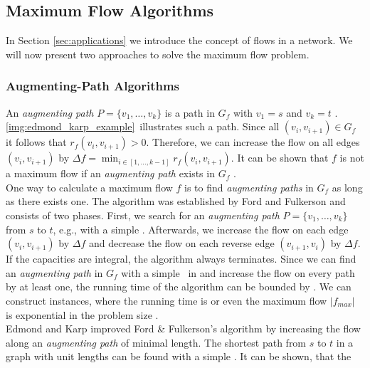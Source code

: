 
\subsection{Maximum Flow Algorithms}
\label{sec:max_flow}

In Section \ref{sec:applications} we introduce the concept of flows in a network. We
will now present two approaches to solve the maximum flow problem.

\subsubsection{Augmenting-Path Algorithms}
\label{sec:aug_path}

An \emph{augmenting path} $P = \{v_1,\ldots,v_k\}$ is a path in $G_f$ with $v_1 = s$ and 
$v_k = t$ \cite{edmonds1972theoretical}. \autoref{img:edmond_karp_example}~illustrates such a path.
Since all $(v_i,v_{i+1}) \in G_f$ it follows that $r_f(v_i,v_{i+1}) > 0$. 
Therefore, we can increase the flow on all edges $(v_i,v_{i+1})$ by 
$\Delta f = \min_{i \in [1,\ldots,k-1]} r_f(v_i,v_{i+1})$. It can be shown that $f$ is not a
maximum flow if an \emph{augmenting path} exists in $G_f$ \cite{edmonds1972theoretical}. \\
One way to calculate a maximum flow $f$ is to find \emph{augmenting paths} in $G_f$ as
long as there exists one. The algorithm was established by Ford and Fulkerson \cite{ford1956maximal} and
consists of two phases. First, we search for an \emph{augmenting path} $P = \{v_1,\ldots,v_k\}$
from $s$ to $t$, e.g., with a simple \DFS. Afterwards, we increase the flow on each
edge $(v_i,v_{i+1})$ by $\Delta f$ and decrease the flow on each reverse edge $(v_{i+1},v_i)$
by $\Delta f$. If the capacities are integral, the algorithm always terminates. Since we can find an \emph{augmenting
path} in $G_f$ with a simple \DFS~in  and increase the
flow on every path by at least one, the running time of the algorithm can be bounded by .
We can construct instances, where the running time is  or even the maximum flow $|f_{max}|$ 
is exponential in the problem size \cite{edmonds1972theoretical}. \\
Edmond and Karp \cite{edmonds1972theoretical} improved Ford \& Fulkerson's algorithm by increasing the flow
along an \emph{augmenting path} of minimal length. The shortest path from $s$ to $t$ in a 
graph with unit lengths can be found with a simple \BFS. It can be shown, that the
